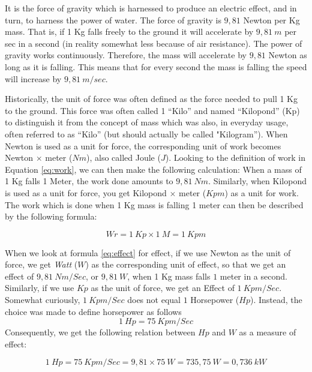 It is the force of gravity which is harnessed to produce an electric effect, and in turn, to harness the power of water. The force of gravity is $9,81$ Newton per Kg mass. That is, if 1 Kg falls freely to the ground it will accelerate by $9,81 \ m$ per sec in a second (in reality somewhat less because of air resistance). The power of gravity works continuously. Therefore, the mass will accelerate by $9,81$ Newton as long as it is falling. This means that for every second the mass is falling the speed will increase by $9,81 \ m/sec$.

Historically, the unit of force was often defined as the force needed to pull 1 Kg to the ground. This force was often called 1 “Kilo” and named “Kilopond” (Kp) to distinguish it from the concept of mass which was also, in everyday usage, often referred to as “Kilo” (but should actually be called "Kilogram”). When Newton is used as a unit for force, the corresponding unit of work becomes Newton $\times$ meter ($Nm$), also called Joule ($J$). Looking to the definition of work in Equation \ref{eq:work}, we can then make the following calculation: When a mass of 1 Kg falls 1 Meter, the work done amounts to $9,81 \ Nm$. Similarly, when Kilopond is used as a unit for force, you get Kilopond $\times$ meter ($Kpm$) as a unit for work. The work which is done when 1 Kg mass is falling 1 meter can then be described by the following formula:

\begin{equation}\label{eq:work}
Wr = 1 \ Kp \times 1 \ M = 1 \ Kpm 
\end{equation}

When we look at formula \ref{eq:effect} for effect, if we use Newton as the unit of force, we get \emph{Watt} ($W$) as the corresponding unit of effect, so that we get an effect of $9,81 \ Nm/Sec$, or $9,81 \ W$, when 1 Kg mass falls $1$ meter in a second. Similarly, if we use $Kp$ as the unit of force, we get an Effect of $1 \ Kpm/Sec$. Somewhat curiously, $1 \ Kpm/Sec$ does not equal $1$ Horsepower ($Hp$). Instead, the choice was made to define horsepower as follows
\begin{equation}\label{eq:hp}
1 \ Hp = 75 \ Kpm/Sec
\end{equation}
Consequently, we get the following relation between $Hp$ and $W$ as a measure of effect:

\begin{equation}\label{eq:hpw}
1 \ Hp = 75 \ Kpm /Sec = 9,81 \times 75 \ W = 735,75 \ W = 0,736 \ kW
\end{equation}

